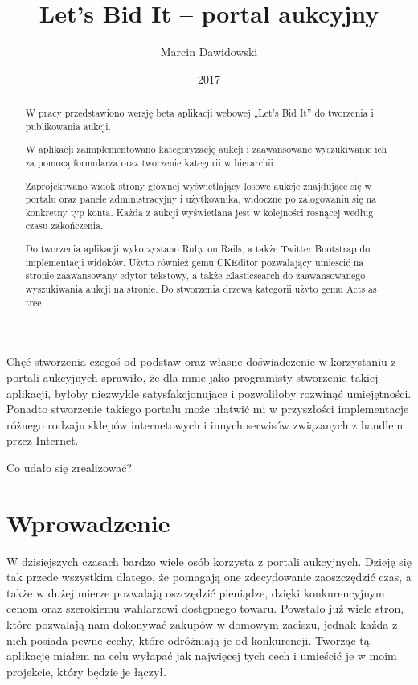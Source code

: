 \documentclass[brudnopis]{xmgr}
\author   {Marcin Dawidowski}
\title    {Let’s Bid It – portal aukcyjny}
\date     {2017}
\begin{document}
\begin{abstract}
  W pracy przedstawiono wersję beta aplikacji webowej „Let's Bid It” do tworzenia i publikowania aukcji.
  
  W aplikacji zaimplementowano kategoryzację aukcji i zaawansowane wyszukiwanie ich za pomocą formularza oraz tworzenie kategorii w hierarchii.

  Zaprojektwano widok strony głównej wyświetlający losowe aukcje znajdujące się w portalu oraz panele administracyjny i użytkownika, widoczne po zalogowaniu się na konkretny typ konta. Każda z aukcji wyświetlana jest w kolejności rosnącej według czasu zakończenia.

  Do tworzenia aplikacji wykorzystano Ruby on Rails, a także Twitter Bootstrap do implementacji widoków. Użyto również gemu CKEditor pozwalający umieścić na stronie zaawansowany edytor tekstowy, a także Elasticsearch do zaawansowanego wyszukiwania aukcji na stronie. Do stworzenia drzewa kategorii użyto gemu Acts as tree.

\end{abstract}


\maketitle

\introduction

Chęć stworzenia czegoś od podstaw oraz własne doświadczenie w korzystaniu z portali aukcyjnych sprawiło, że dla mnie jako programisty stworzenie takiej aplikacji, byłoby niezwykle satysfakcjonujące i pozwoliłoby rozwinąć umiejętności. Ponadto stworzenie takiego portalu może ułatwić mi w przyszłości implementacje różnego rodzaju sklepów internetowych i innych serwisów związanych z handlem przez Internet.

Co udało się zrealizować?


\chapter{Wprowadzenie}

W dzisiejszych czasach bardzo wiele osób korzysta z portali aukcyjnych. 
Dzieję się tak przede wszystkim dlatego, że pomagają one zdecydowanie
zaoszczędzić czas, a także w dużej mierze pozwalają oszczędzić 
pieniądze, dzięki konkurencyjnym cenom oraz szerokiemu wahlarzowi dostępnego
towaru. Powstało już wiele stron, które pozwalają nam dokonywać zakupów w 
domowym zaciszu, jednak każda z nich posiada pewne cechy, które odróżniają
je od konkurencji. Tworząc tą aplikację miałem na celu wyłapać jak najwięcej 
tych cech i umieścić je w moim projekcie, który będzie je łączył.
\end{document}
